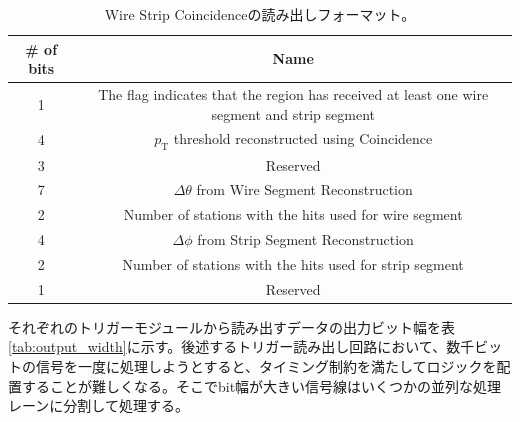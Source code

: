 \begin{table}[]
    \centering
    \caption[Wire Strip Coincidenceの読み出しフォーマット]{Wire Strip Coincidenceの読み出しフォーマット。}
    \label{tab:WS_format}
    \begin{tabular}{|c|c|}
    \hline
    \# of bits & Name                                                                                        \\ \hline\hline
    1          & The flag indicates that the region has received at least one wire segment and strip segment \\ \hline
    4          & $p_{\mathrm{T}}$ threshold reconstructed using Coincidence                                  \\ \hline
    3          & Reserved                                                                                    \\ \hline
    7          & $\Delta\theta$ from Wire Segment Reconstruction                                             \\ \hline
    2          & Number of stations with the hits used for wire segment                                      \\ \hline
    4          & $\Delta\phi$ from Strip Segment Reconstruction                                              \\ \hline
    2          & Number of stations with the hits used for strip segment                                     \\ \hline
    1          & Reserved                                                                                    \\ \hline
    \end{tabular}
\end{table}


それぞれのトリガーモジュールから読み出すデータの出力ビット幅を表\ref{tab:output_width}に示す。後述するトリガー読み出し回路において、数千ビットの信号を一度に処理しようとすると、タイミング制約を満たしてロジックを配置することが難しくなる。そこでbit幅が大きい信号線はいくつかの並列な処理レーンに分割して処理する。

